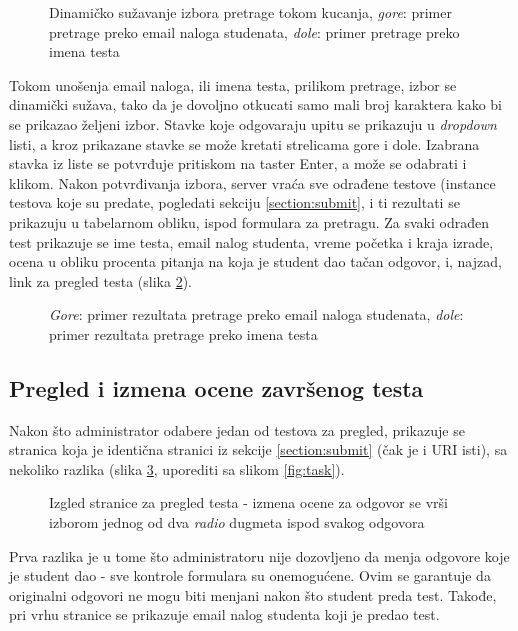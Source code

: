 \begin{figure}[h]
\centering
{}
\caption{Dinamičko sužavanje izbora pretrage tokom kucanja, \textit{gore}: primer pretrage preko email naloga studenata, \textit{dole}: primer pretrage preko imena testa}
\label{fig:assignments-admin}
\end{figure}

Tokom unošenja email naloga, ili imena testa, prilikom pretrage, izbor se dinamički sužava, tako da je dovoljno otkucati samo mali broj karaktera kako bi se prikazao željeni izbor. Stavke koje odgovaraju upitu se prikazuju u \textit{dropdown} listi, a kroz prikazane stavke se može kretati strelicama gore i dole. Izabrana stavka iz liste se potvrđuje pritiskom na taster Enter, a može se odabrati i klikom. Nakon potvrđivanja izbora, server vraća sve odrađene testove (instance testova koje su predate, pogledati sekciju \ref{section:submit}, i ti rezultati se prikazuju u tabelarnom obliku, ispod formulara za pretragu. Za svaki odrađen test prikazuje se ime testa, email nalog studenta, vreme početka i kraja izrade, ocena u obliku procenta pitanja na koja je student dao tačan odgovor, i, najzad, link za pregled testa (slika \ref{fig:assignments-admin-results}).
\begin{figure}[h]
\centering
{}
\caption{\textit{Gore}: primer rezultata pretrage preko email naloga studenata, \textit{dole}: primer rezultata pretrage preko imena testa}
\label{fig:assignments-admin-results}
\end{figure}

\subsection{Pregled i izmena ocene završenog testa}
Nakon što administrator odabere jedan od testova za pregled, prikazuje se stranica koja je identična stranici iz sekcije \ref{section:submit} (čak je i URI isti), sa nekoliko razlika (slika \ref{fig:task-admin}, uporediti sa slikom \ref{fig:task}).
\begin{figure}[h]
\centering
{}
\caption{Izgled stranice za pregled testa - izmena ocene za odgovor se vrši izborom jednog od dva \textit{radio} dugmeta ispod svakog odgovora}
\label{fig:task-admin}
\end{figure}
Prva razlika je u tome što administratoru nije dozovljeno da menja odgovore koje je student dao - sve kontrole formulara su onemogućene. Ovim se garantuje da originalni odgovori ne mogu biti menjani nakon što student preda test. Takođe, pri vrhu stranice se prikazuje email nalog studenta koji je predao test.

